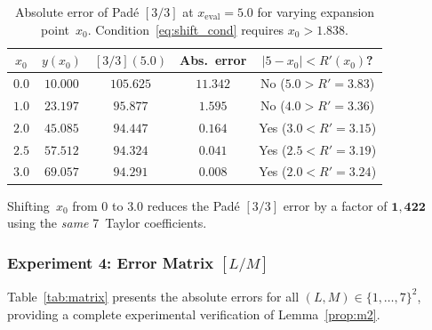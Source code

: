 \documentclass[12pt,a4paper]{article}
\theoremstyle{definition}
\theoremstyle{remark}
\begin{document}
\begin{table}[H]
  \centering
  \caption{Absolute error of Padé $[3/3]$ at
    $x_{\mathrm{eval}} = 5.0$ for varying expansion point~$x_0$.
    Condition~\eqref{eq:shift_cond} requires $x_0 > 1.838$.}
  \label{tab:shift}
  \renewcommand{\arraystretch}{1.15}
  \begin{tabular}{@{}ccccc@{}}
    \toprule
    $x_0$ & $y(x_0)$ & $[3/3](5.0)$
      & Abs.\ error
      & $|5 - x_0| < R'(x_0)$?\\
    \midrule
    $0.0$ & $10.000$ & $105.625$ & $11.342$ & No  ($5.0 > R' = 3.83$)\\
    $1.0$ & $23.197$ &  $95.877$ &  $1.595$ & No  ($4.0 > R' = 3.36$)\\
    $2.0$ & $45.085$ &  $94.447$ &  $0.164$ & Yes ($3.0 < R' = 3.15$)\\
    $2.5$ & $57.512$ &  $94.324$ &  $0.041$ & Yes ($2.5 < R' = 3.19$)\\
    $3.0$ & $69.057$ &  $94.291$ &  $0.008$ & Yes ($2.0 < R' = 3.24$)\\
    \bottomrule
  \end{tabular}
\end{table}

Shifting~$x_0$ from $0$ to $3.0$ reduces the Padé $[3/3]$ error by
a factor of $\mathbf{1{,}422}$ using the \emph{same} 7~Taylor
coefficients.

\subsubsection{Experiment 4: Error Matrix \texorpdfstring{$[L/M]$}{[L/M]}}

Table~\ref{tab:matrix} presents the absolute errors for all
$(L, M) \in \{1, \ldots, 7\}^2$, providing a complete experimental
verification of Lemma~\ref{prop:m2}.
\end{document}
